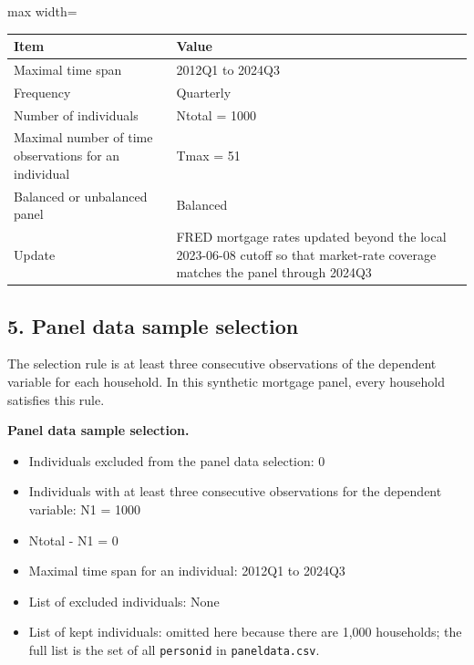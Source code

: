 \documentclass[a4paper,11pt]{article}
\renewcommand{\_}{\textunderscore\allowbreak}
\renewcommand{\arraystretch}{1.25}
\providecommand{\tightlist}{%
  \setlength{\itemsep}{0pt}\setlength{\parskip}{0pt}}
\begin{document}
\begin{center}
\begingroup
\small
\setlength{\tabcolsep}{4pt}
\renewcommand{\arraystretch}{1.22}
\begin{adjustbox}{max width=\textwidth}
\begin{tabular}{@{}
  >{\raggedright\arraybackslash}p{}
  >{\raggedright\arraybackslash}p{}@{}}
\toprule
Item & Value \\
\midrule
Maximal time span & 2012Q1 to 2024Q3 \\
Frequency & Quarterly \\
Number of individuals & Ntotal = 1000 \\
Maximal number of time observations for an individual & Tmax = 51 \\
Balanced or unbalanced panel & Balanced \\
Update & FRED mortgage rates updated beyond the local 2023-06-08 cutoff
so that market-rate coverage matches the panel through 2024Q3 \\
\bottomrule
\end{tabular}
\end{adjustbox}
\endgroup
\end{center}

\hypertarget{panel-data-sample-selection}{%
\subsection{5. Panel data sample
selection}\label{panel-data-sample-selection}}

The selection rule is at least three consecutive observations of the
dependent variable for each household. In this synthetic mortgage panel,
every household satisfies this rule.

\textbf{Panel data sample selection.}

\begin{itemize}
\tightlist
\item
  Individuals excluded from the panel data selection: 0
\item
  Individuals with at least three consecutive observations for the
  dependent variable: N1 = 1000
\item
  Ntotal - N1 = 0
\item
  Maximal time span for an individual: 2012Q1 to 2024Q3
\item
  List of excluded individuals: None
\item
  List of kept individuals: omitted here because there are 1,000
  households; the full list is the set of all \texttt{personid} in
  \texttt{panel\_data.csv}.
\end{itemize}
\end{document}

